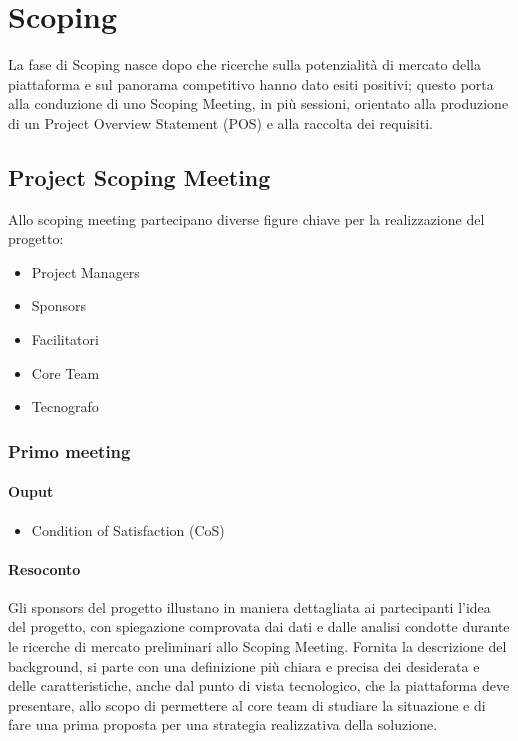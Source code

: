 \chapter{Scoping}

La fase di Scoping nasce dopo che ricerche sulla potenzialità di mercato della piattaforma e sul panorama
competitivo hanno dato esiti positivi; questo porta alla conduzione di uno Scoping Meeting, in più sessioni, 
orientato alla produzione di un Project Overview Statement (POS) e alla raccolta dei requisiti.

\section{Project Scoping Meeting}
Allo scoping meeting partecipano diverse figure chiave per la realizzazione del progetto:
\begin{itemize}
    \item Project Managers
    \item Sponsors
    \item Facilitatori
    \item Core Team 
    \item Tecnografo
\end{itemize}

\subsection*{Primo meeting}
\subsubsection*{Ouput}
\begin{itemize}
    \item Condition of Satisfaction (CoS)
\end{itemize} 
\subsubsection*{Resoconto}
Gli sponsors del progetto illustano in maniera dettagliata ai partecipanti l'idea del progetto, con spiegazione 
comprovata dai dati e dalle analisi condotte durante le ricerche di mercato preliminari allo Scoping Meeting. 
Fornita la descrizione del background, si parte con una definizione più chiara e precisa dei desiderata e delle caratteristiche,
anche dal punto di vista tecnologico, che la piattaforma deve presentare, allo scopo di permettere al core team di studiare 
la situazione e di fare una prima proposta per una strategia realizzativa della soluzione.        
